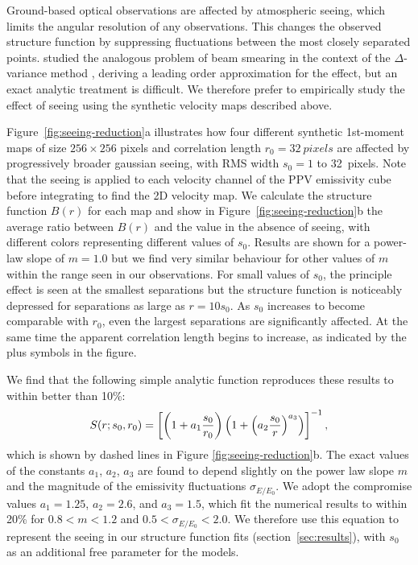\documentclass[fleqn,usenatbib, useAMS, a4paper]{mnras}
\newcommand\startNEW{\color{black}}
\newcommand\stopNEW{\color{black}}
\newcommand\NEW[1]{\startNEW #1\stopNEW\relax}
\newcommand\shortsig[1]{\ensuremath{\sigma_{#1/#1_0}}}
\begin{document}
Ground-based optical observations are affected by atmospheric seeing,
which limits the angular resolution of any observations.
This changes the observed structure function by suppressing fluctuations
between the most closely separated points.
\citet{Bensch:2001l} studied the  analogous problem
of beam smearing in the context of the \(\Delta\)-variance method \citep{Stutzki:1998a}, 
deriving a leading order approximation for the effect,
but an exact analytic treatment is difficult.
We therefore prefer to empirically study the effect of seeing using the
synthetic velocity maps described above.

\NEW{Figure~\ref{fig:seeing-reduction}a} illustrates how four different
synthetic \NEW{1st-moment maps of} size \(256\times256\) pixels
and correlation length \NEW{\(r_0 = \SI{32}{pixels}\)}
are affected by progressively broader gaussian seeing,
with RMS width \(s_0 = 1\) to \SI{32}{pixels}.
\NEW{%
  Note that the seeing is applied to each velocity channel of the
  PPV emissivity cube before integrating to find the 2D velocity map.
}
We calculate the structure function \(B(r)\) for each map and show
in Figure~\ref{fig:seeing-reduction}b the average ratio between
\(B(r)\) and the value in the absence of seeing,
with different colors representing different values of \(s_0\).
Results are shown for a power-law slope of \NEW{\(m = 1.0\)}
but we find very similar behaviour for other values of \(m\) within the range
seen in our observations.
For small values of \(s_0\), the principle effect is seen at
the smallest separations but the structure function is noticeably depressed
for separations as large as \(r = 10 s_0\).
As \(s_0\) increases to become comparable with \(r_0\),
even the largest separations are significantly affected.
At the same time the apparent correlation length begins to increase,
as indicated by the plus symbols in the figure.

We find that the following simple analytic function reproduces
these results to within better than 10\%:
\begin{equation}\label{eq:seeingemp2}
  \startNEW
  S(r; s_0, r_0) = 
  \left [
    \left (1+a_1\frac{s_0}{r_0} \right) 
    \left(1+ \left (a_2 \frac{ s_0}{r} \right) ^{a_3} \right)
  \right ]^{-1} ,
  \stopNEW
\end{equation}
which is shown by dashed lines in \NEW{Figure \ref{fig:seeing-reduction}b}.
\NEW{%
  The exact values of the constants \(a_1\), \(a_2\), \(a_3\)
  are found to depend slightly on the power law slope \(m\)
  and the magnitude of the emissivity fluctuations \(\shortsig{E}\).
  We adopt the compromise values \(a_1 = 1.25\),
  \(a_2 = 2.6\), and \(a_3 = 1.5\), which fit the numerical results to
  within 20\% for \(0.8 < m < 1.2\) and \(0.5 < \shortsig{E} < 2.0\).}
We therefore use this equation to represent the seeing
in our structure function fits (section~\ref{sec:results}),
with \(s_0\) as an additional free parameter for the models.
\end{document}
